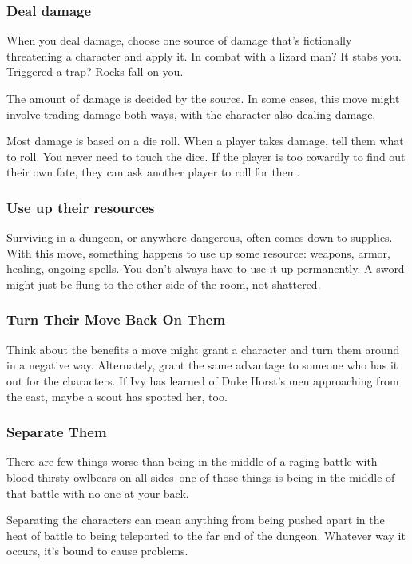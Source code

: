 \subsubsection{Deal damage}


 When you deal damage, choose one source of damage that's fictionally threatening a character and apply it. In combat with a lizard man? It stabs you. Triggered a trap? Rocks fall on you.


 The amount of damage is decided by the source. In some cases, this move might involve trading damage both ways, with the character also dealing damage.


 Most damage is based on a die roll. When a player takes damage, tell them what to roll. You never need to touch the dice. If the player is too cowardly to find out their own fate, they can ask another player to roll for them.
\subsubsection{Use up their resources}


 Surviving in a dungeon, or anywhere dangerous, often comes down to supplies. With this move, something happens to use up some resource: weapons, armor, healing, ongoing spells. You don't always have to use it up permanently. A sword might just be flung to the other side of the room, not shattered.
\subsubsection{Turn Their Move Back On Them}


 Think about the benefits a move might grant a character and turn them around in a negative way. Alternately, grant the same advantage to someone who has it out for the characters. If Ivy has learned of Duke Horst's men approaching from the east, maybe a scout has spotted her, too.
\subsubsection{Separate Them}


 There are few things worse than being in the middle of a raging battle with blood-thirsty owlbears on all sides--one of those things is being in the middle of that battle with no one at your back.


 Separating the characters can mean anything from being pushed apart in the heat of battle to being teleported to the far end of the dungeon. Whatever way it occurs, it's bound to cause problems.
